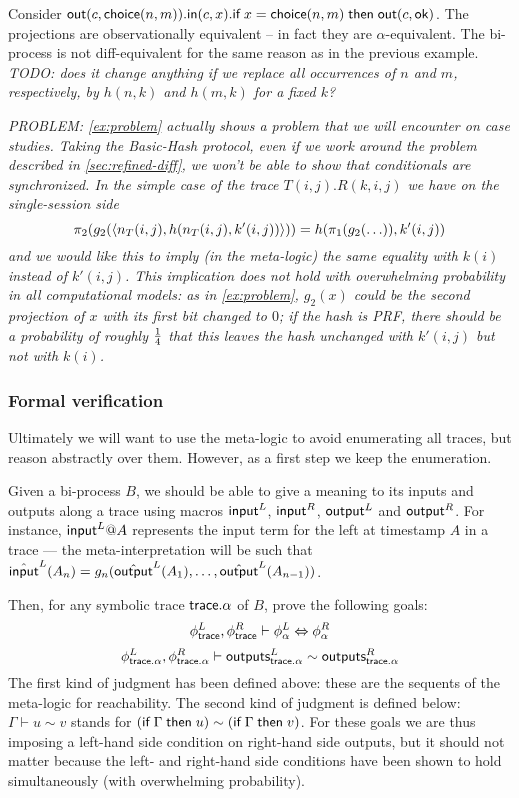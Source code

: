 \begin{example} \label{ex:problem}
  Consider $\mathsf{out}(c,\mathsf{choice}(n,m)).
  \mathsf{in}(c,x).
  \textsf{if}\; x=\mathsf{choice}(n,m) \;\textsf{then}\; \mathsf{out}(c,\mathsf{ok})$.
  The projections are observationally equivalent -- in fact they are
  $\alpha$-equivalent.
  The bi-process is not diff-equivalent for the same reason as in the
  previous example.
  \emph{TODO: does it change anything if we replace all occurrences
  of $n$ and $m$, respectively, by $h(n,k)$ and $h(m,k)$ for a fixed $k$?}
\end{example}

\emph{PROBLEM: \cref{ex:problem} actually shows a problem that we will encounter
on case studies. Taking the Basic-Hash protocol, even if we work around
the problem described in \cref{sec:refined-diff}, we won't be able to show
that conditionals are synchronized.  In the simple case of the trace
$T(i,j).R(k,i,j)$ we have
on the single-session side
$$\pi_2(g_2(\langle n_T(i,j),h(n_T(i,j),k'(i,j)) \rangle)) =
 h(\pi_1(g_2(\ldots)),k'(i,j))$$
and we would like this to imply (in the meta-logic)
the same equality with $k(i)$ instead of $k'(i,j)$.
This implication does not hold with overwhelming probability in all
computational models: as in \cref{ex:problem}, $g_2(x)$ could be the second
projection of $x$ with its first bit changed to $0$; if the hash is PRF,
there should be a probability of roughly $1 \over 4$ that this leaves
the hash unchanged with $k'(i,j)$ but not with $k(i)$.}

\subsubsection{Formal verification}

Ultimately we will want to use the meta-logic to avoid enumerating all
traces, but reason abstractly over them. However, as a first step we
keep the enumeration.

Given a bi-process $B$, we should be able to give a meaning to its inputs
and outputs along a trace using macros $\textsf{input}^L$, $\textsf{input}^R$, $\textsf{output}^L$
and $\textsf{output}^R$. For instance, $\textsf{input}^L@A$ represents the input term for
the left at timestamp $A$ in a trace --- the meta-interpretation will
be such that
$\hat{\textsf{input}}^L(A_n) = g_n(\hat{\textsf{output}}^L(A_1),\ldots,\hat{\textsf{output}}^L(A_{n-1}))$.

Then, for any symbolic trace $\textsf{trace}.\alpha$ of $B$, prove the following goals:
$$ \phi^L_{\textsf{trace}}, \phi^R_{\textsf{trace}} \vdash \phi^L_\alpha \Leftrightarrow \phi^R_\alpha $$
$$ \phi^L_{\textsf{trace}.\alpha}, \phi^R_{\textsf{trace}.\alpha} \vdash 
   \textsf{outputs}_{\textsf{trace}.\alpha}^L \sim \textsf{outputs}_{\textsf{trace}.\alpha}^R $$
The first kind of judgment has been defined above: these are the sequents
of the meta-logic for reachability. The second kind of judgment is defined
below: $\Gamma \vdash u \sim v$ stands for $(\textsf{if}\; \Gamma \;\textsf{then}\; u) \sim
(\textsf{if}\; \Gamma \;\textsf{then}\; v)$. For these goals we are thus imposing a left-hand
side condition on right-hand side outputs, but it should not matter because
the left- and right-hand side conditions have been shown to hold 
simultaneously (with overwhelming probability).


